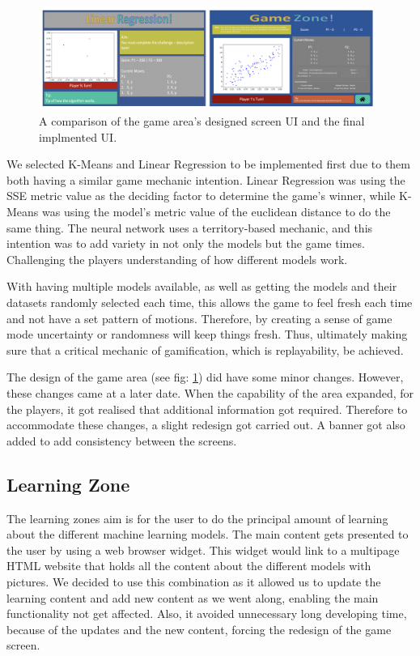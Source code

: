 		\begin{figure}[t]
			\begin{center}
				\includegraphics[width=11cm]{graphics/game_zone.png}
				\caption{A comparison of the game area's designed screen UI and the final implmented UI.}
				\label{fig:ui_ga}
			\end{center}
		\end{figure}
		
		
		We selected K-Means and Linear Regression to be implemented first due to them both having a similar game mechanic intention. Linear Regression was using the SSE metric value as the deciding factor to determine the game's winner, while K-Means was using the model's metric value of the euclidean distance to do the same thing. The neural network uses a territory-based mechanic, and this intention was to add variety in not only the models but the game times. Challenging the players understanding of how different models work.
		
		With having multiple models available, as well as getting the models and their datasets randomly selected each time, this allows the game to feel fresh each time and not have a set pattern of motions. Therefore, by creating a sense of game mode uncertainty or randomness will keep things fresh. Thus, ultimately making sure that a critical mechanic of gamification, which is replayability, be achieved.  
		
		The design of the game area (see fig: \ref{fig:ui_ga}) did have some minor changes. However, these changes came at a later date. When the capability of the area expanded, for the players, it got realised that additional information got required. Therefore to accommodate these changes, a slight redesign got carried out. A banner got also added to add consistency between the screens.
	
	\subsection{Learning Zone}
	
	The learning zones aim is for the user to do the principal amount of learning about the different machine learning models. The main content gets presented to the user by using a web browser widget. This widget would link to a multipage HTML website that holds all the content about the different models with pictures. We decided to use this combination as it allowed us to update the learning content and add new content as we went along, enabling the main functionality not get affected. Also, it avoided unnecessary long developing time, because of the updates and the new content, forcing the redesign of the game screen. 
	
